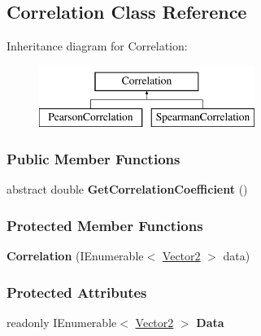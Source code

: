 \hypertarget{classDataTools_1_1correlation_1_1Correlation}{}\subsection{Correlation Class Reference}
\label{classDataTools_1_1correlation_1_1Correlation}
Inheritance diagram for Correlation\+:\begin{figure}[H]
\begin{center}
\leavevmode
\includegraphics[height=2.000000cm]{classDataTools_1_1correlation_1_1Correlation}
\end{center}
\end{figure}
\subsubsection*{Public Member Functions}
\begin{DoxyCompactItemize}
\item 
\mbox{\label{classDataTools_1_1correlation_1_1Correlation_aceb0beb9f4f7d80e96e8d94b20cdc823}} 
abstract double {\bfseries Get\+Correlation\+Coefficient} ()
\end{DoxyCompactItemize}
\subsubsection*{Protected Member Functions}
\begin{DoxyCompactItemize}
\item 
\mbox{\label{classDataTools_1_1correlation_1_1Correlation_a9cfdaf3f9f7c45c8d50d127e144f22bb}} 
{\bfseries Correlation} (I\+Enumerable$<$ \hyperlink{classDataTools_1_1Vector2}{Vector2} $>$ data)
\end{DoxyCompactItemize}
\subsubsection*{Protected Attributes}
\begin{DoxyCompactItemize}
\item 
\mbox{\label{classDataTools_1_1correlation_1_1Correlation_a433eb6b10599d4c45f8df9022b2133c2}} 
readonly I\+Enumerable$<$ \hyperlink{classDataTools_1_1Vector2}{Vector2} $>$ {\bfseries Data}
\end{DoxyCompactItemize}
